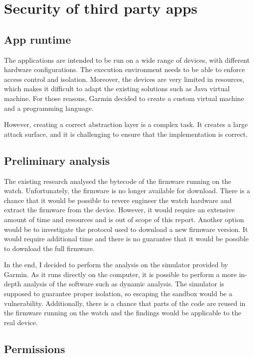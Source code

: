 
\section{Security of third party apps}

\subsection{App runtime}

The applications are intended to be run on a wide range of devices, with different hardware configurations.
The execution environment needs to be able to enforce access control and isolation.
Moreover, the devices are very limited in resources, which makes it difficult to adapt the existing solutions such as Java virtual machine.
For those reasons, Garmin decided to create a custom virtual machine and a programming language.

However, creating a correct abstraction layer is a complex task.
It creates a large attack surface, and it is challenging to ensure that the implementation is correct.

\subsection{Preliminary analysis}
The existing research analysed the bytecode of the firmware running on the watch.
Unfortunately, the firmware is no longer available for download.
There is a chance that it would be possible to revere engineer the watch hardware and extract the firmware from the device.
However, it would require an extensive amount of time and resources and is out of scope of this report.
Another option would be to investigate the protocol used to download a new firmware version.
It would require additional time and there is no guarantee that it would be possible to download the full firmware.

In the end, I decided to perform the analysis on the simulator provided by Garmin.
As it runs directly on the computer, it is possible to perform a more in-depth analysis of the software such as dynamic analysis.
The simulator is supposed to guarantee proper isolation, so escaping the sandbox would be a vulnerability.
Additionally, there is a chance that parts of the code are reused in the firmware running on the watch and the findings would be applicable to the real device.

\subsection{Permissions}

